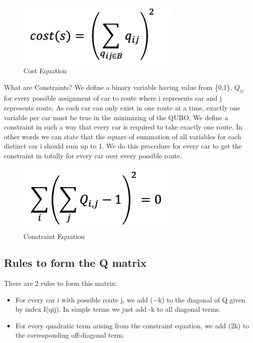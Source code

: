 \documentclass[conference]{IEEEtran}
\begin{document}
\begin{figure}[ht]
\centerline{\includegraphics[width=8cm]{cost.png}}
\caption{Cost Equation}
\label{fig}
\end{figure}
What are Constraints?\vspace{6pt}
\newline
We define a binary variable having value from \{0,1\}, \( \textit{Q} _{ij} \) for every possible assignment of car to route where i represents car and j represents route. As each car can only exist in one route at a time, exactly one variable per car must be true in the minimizing of the QUBO, We define a constraint in such a way that every car is required to take exactly one route. In other words we can state that the square of summation of all variables for each distinct car i should sum up to 1. We do this procedure for every car to get the constraint in totally for every car over every possible route.
\vspace{6pt}

\begin{figure}[ht]
\centerline{\includegraphics[width=8cm]{constraint.png}}
\caption{Constraint Equation}
\label{fig}
\end{figure}

\subsection{Rules to form the Q matrix}

There are 2 rules to form this matrix:
\begin{itemize}
    \item For every car i with possible route j, we add (−k) to the diagonal of Q given by index I(qij).\newline
In simple terms we just add -k to all diagonal terms.\vspace{6pt}

\item For every quadratic term arising from the constraint equation, we add (2k) to the corresponding off-diagonal term.
\end{itemize}
\vspace{6pt}
\end{document}
